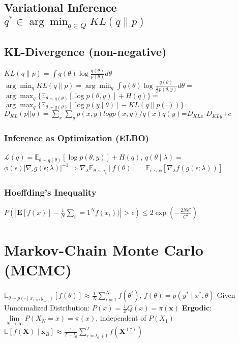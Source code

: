 \documentclass[a4paper, 11pt, landscape]{article}
\begin{document}
\begin{multicols*}{3}
\subsection{Variational Inference $q^{*} \in \arg \min _{q \in Q} K L(q \| p)$}

\subsection{KL-Divergence (non-negative)}
$K L(q \| p)=\int q(\theta) \log \frac{q(\theta)}{p(\theta)} d \theta$
\newline $\arg \min _{q} K L(q \| p)=\arg \min _{q} \int q(\theta) \log \frac{q(\theta)}{\frac{1}{Z} p(\theta, y)} d \theta =$
\newline $\arg \max _{q} \{\mathbb{E}_{\theta \sim q(\theta)}[\log p(\theta, y)]+H(q)\}=$
\newline $\arg \max _{q} \{\mathbb{E}_{\theta \sim q(\theta)}[\log p(y \mid \theta)]-K L(q \| p(\cdot))\}$
\newline $D_{KL}(p||q)=\sum_x\sum_y p(x,y)log p(x,y)/q(x)q(y)\text{=}D_{KL x}\text{-}D_{KL y}\text{+}c$
\subsubsection{Inference as Optimization (ELBO)}
$\mathcal{L}(q) = \mathbb{E}_{\theta \sim q(\theta)}[\log p(\theta, y)]+H(q)$, \space\space\space\space\space\space\space\space\space\space\space\space $q(\theta \mid \lambda)=$
\newline $\phi(\epsilon)\left|\nabla_{\epsilon} g(\epsilon ; \lambda)\right|^{-1} \Rightarrow \nabla_{\lambda} \mathbb{E}_{\theta \sim q_{\lambda}}[f(\theta)] {=} \mathbb{E}_{\epsilon \sim \phi}\left[\nabla_{\lambda} f(g(\epsilon ; \lambda))\right]$

\subsubsection{Hoeffding's Inequality}
$P(|\mathbf{E}[f(x)] -\frac 1  N \sum _i = 1 ^N f(x_i))| > \epsilon) \leq 2\exp(-\frac{2N\epsilon^2}{C^2})$

\section{Markov-Chain Monte Carlo (MCMC)}
$\mathbb{E}_{\theta \sim p(\cdot \mid x_{1:n},y_{1:n})}[f(\theta)] \approx \frac{1}{N} \sum_{i=1}^{N} f\left(\theta^{i}\right)$, $f\left(\theta\right) = p(y^* \mid x^*,\theta)$
\newline Given Unnormalized Distribution: $P(x) = \frac{1}{Z}Q(x) = \pi(\mathbf{x})$
\newline \textbf{Ergodic}: $\lim\limits_{N \rightarrow \infty}  P\left(X_{N}=x\right)=\pi(x)$, independent of $P(X_1)$
\newline $\mathbb{E}\left[f(\mathbf{X}) \mid \mathbf{x}_{B}\right] \approx \frac{1}{T-t_{0}} \sum_{\tau=t_{0}+1}^{T} f\left(\mathbf{X}^{(\tau)}\right)$


\end{multicols*}
\end{document}
